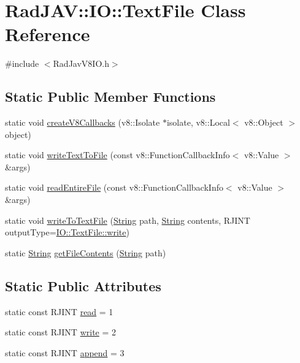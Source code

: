 \hypertarget{class_rad_j_a_v_1_1_i_o_1_1_text_file}{}\section{Rad\+J\+AV\+:\+:IO\+:\+:Text\+File Class Reference}
\label{class_rad_j_a_v_1_1_i_o_1_1_text_file}


{\ttfamily \#include $<$Rad\+Jav\+V8\+I\+O.\+h$>$}

\subsection*{Static Public Member Functions}
\begin{DoxyCompactItemize}
\item 
static void \mbox{\hyperlink{class_rad_j_a_v_1_1_i_o_1_1_text_file_ad19422dc71517cf5a45b6a7ed3920bd0}{create\+V8\+Callbacks}} (v8\+::\+Isolate $\ast$isolate, v8\+::\+Local$<$ v8\+::\+Object $>$ object)
\item 
static void \mbox{\hyperlink{class_rad_j_a_v_1_1_i_o_1_1_text_file_ae6790f6a469a8b598fc2b4cae37b143d}{write\+Text\+To\+File}} (const v8\+::\+Function\+Callback\+Info$<$ v8\+::\+Value $>$ \&args)
\item 
static void \mbox{\hyperlink{class_rad_j_a_v_1_1_i_o_1_1_text_file_a3a6cb8a2bd674bbb642180d81bf3b981}{read\+Entire\+File}} (const v8\+::\+Function\+Callback\+Info$<$ v8\+::\+Value $>$ \&args)
\item 
static void \mbox{\hyperlink{class_rad_j_a_v_1_1_i_o_1_1_text_file_a5ce86838dd6aadac22a6fd999e1c9d96}{write\+To\+Text\+File}} (\mbox{\hyperlink{class_rad_j_a_v_1_1_string}{String}} path, \mbox{\hyperlink{class_rad_j_a_v_1_1_string}{String}} contents, R\+J\+I\+NT output\+Type=\mbox{\hyperlink{class_rad_j_a_v_1_1_i_o_1_1_text_file_a24c5acfee32c466406cf25bf5b04f566}{I\+O\+::\+Text\+File\+::write}})
\item 
static \mbox{\hyperlink{class_rad_j_a_v_1_1_string}{String}} \mbox{\hyperlink{class_rad_j_a_v_1_1_i_o_1_1_text_file_a3bdb2de3a935b77faa221840cdfb396a}{get\+File\+Contents}} (\mbox{\hyperlink{class_rad_j_a_v_1_1_string}{String}} path)
\end{DoxyCompactItemize}
\subsection*{Static Public Attributes}
\begin{DoxyCompactItemize}
\item 
static const R\+J\+I\+NT \mbox{\hyperlink{class_rad_j_a_v_1_1_i_o_1_1_text_file_ae53eca4dcc241357d08cd91f31d5d717}{read}} = 1
\item 
static const R\+J\+I\+NT \mbox{\hyperlink{class_rad_j_a_v_1_1_i_o_1_1_text_file_a24c5acfee32c466406cf25bf5b04f566}{write}} = 2
\item 
static const R\+J\+I\+NT \mbox{\hyperlink{class_rad_j_a_v_1_1_i_o_1_1_text_file_a8378e77d475fb9296f4e86ffb707d7bc}{append}} = 3
\end{DoxyCompactItemize}


